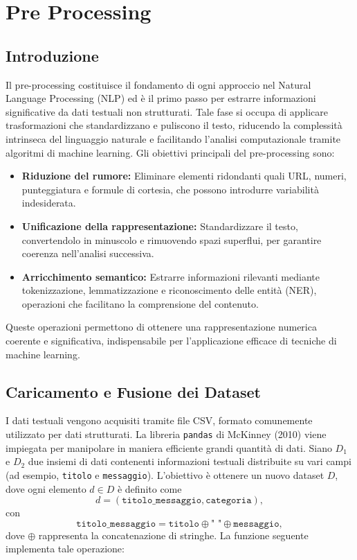 \chapter{Pre Processing}

\section{Introduzione}
Il pre-processing costituisce il fondamento di ogni approccio nel Natural Language Processing (NLP) ed è il primo passo per estrarre informazioni significative da dati testuali non strutturati. Tale fase si occupa di applicare trasformazioni che standardizzano e puliscono il testo, riducendo la complessità intrinseca del linguaggio naturale e facilitando l'analisi computazionale tramite algoritmi di machine learning.
Gli obiettivi principali del pre-processing sono:
\begin{itemize}
    \item \textbf{Riduzione del rumore:} Eliminare elementi ridondanti quali URL, numeri, punteggiatura e formule di cortesia, che possono introdurre variabilità indesiderata.
    \item \textbf{Unificazione della rappresentazione:} Standardizzare il testo, convertendolo in minuscolo e rimuovendo spazi superflui, per garantire coerenza nell'analisi successiva.
    \item \textbf{Arricchimento semantico:} Estrarre informazioni rilevanti mediante tokenizzazione, lemmatizzazione e riconoscimento delle entità (NER), operazioni che facilitano la comprensione del contenuto.
\end{itemize}

Queste operazioni permettono di ottenere una rappresentazione numerica coerente e significativa, indispensabile per l'applicazione efficace di tecniche di machine learning.

\section{Caricamento e Fusione dei Dataset}
I dati testuali vengono acquisiti tramite file CSV, formato comunemente utilizzato per dati strutturati. La libreria \texttt{pandas} di McKinney (2010) viene impiegata per manipolare in maniera efficiente grandi quantità di dati. Siano $D_1$ e $D_2$ due insiemi di dati contenenti informazioni testuali distribuite su vari campi (ad esempio, \texttt{titolo} e \texttt{messaggio}). L'obiettivo è ottenere un nuovo dataset $D$, dove ogni elemento $d \in D$ è definito come
\[
d = (\texttt{titolo\_messaggio}, \texttt{categoria}),
\]
con
\[
\texttt{titolo\_messaggio} = \texttt{titolo} \oplus \texttt{" "} \oplus \texttt{messaggio},
\]
dove $\oplus$ rappresenta la concatenazione di stringhe. La funzione seguente implementa tale operazione:

